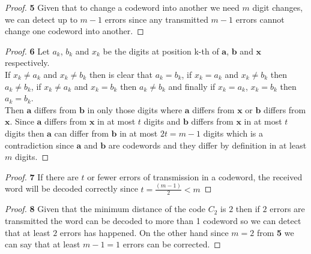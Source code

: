 \documentclass[11pt]{article}
\begin{document}
	\begin{proof}{\textbf{5}}
		Given that to change a codeword into another we need $m$ digit changes, we can detect up to $m-1$ errors since any transmitted $m-1$ errors cannot change one codeword into another.	
	\end{proof}
	\begin{proof}{\textbf{6}}
		Let $a_k$, $b_k$ and $x_k$ be the digits at position k-th of $\bm{a}$, $\bm{b}$ and $\bm{x}$ respectively.\\
		If $x_k \neq a_k$ and $x_k \neq b_k$ then is clear that $a_k=b_k$, if $x_k = a_k$ and $x_k \neq b_k$ then $a_k \neq b_k$, if $x_k \neq a_k$ and $x_k = b_k$ then $a_k \neq b_k$ and finally if $x_k=a_k$, $x_k=b_k$ then $a_k=b_k$.\\
		Then $\bm{a}$ differs from $\bm{b}$ in only those digits where $\bm{a}$ differs from $\bm{x}$ or $\bm{b}$ differs from $\bm{x}$. Since $\bm{a}$ differs from $\bm{x}$ in at most $t$ digits and $\bm{b}$ differs from $\bm{x}$ in at most $t$ digits then $\bm{a}$ can differ from $\bm{b}$ in at most $2t=m-1$ digits which is a contradiction since $\bm{a}$ and $\bm{b}$ are codewords and they differ by definition in at least $m$ digits.
	\end{proof}
	\begin{proof}{\textbf{7}}
		If there are $t$ or fewer errors of transmission in a codeword, the received word will be decoded correctly since $t=\frac{(m-1)}{2} < m$
	\end{proof}
	\begin{proof}{\textbf{8}}
		Given that the minimum distance of the code $C_2$ is $2$ then if $2$ errors are transmitted the word can be decoded to more than 1 codeword so we can detect that at least $2$ errors has happened. On the other hand since $m=2$ from \textbf{5} we can say that at least $m-1=1$ errors can be corrected.
	\end{proof}
\end{document}
